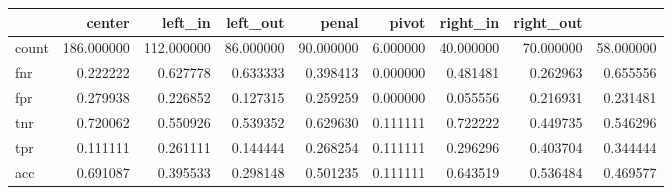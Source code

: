 \begin{tabular}{lrrrrrrrr}
\toprule
{} &      center &    left\_in &   left\_out &     penal &      pivot &   right\_in &  right\_out \\
\midrule
count &  186.000000 &  112.000000 &  86.000000 &  90.000000 &  6.000000 &  40.000000 &  70.000000 &  58.000000 \\
fnr   &    0.222222 &    0.627778 &   0.633333 &   0.398413 &  0.000000 &   0.481481 &   0.262963 &   0.655556 \\
fpr   &    0.279938 &    0.226852 &   0.127315 &   0.259259 &  0.000000 &   0.055556 &   0.216931 &   0.231481 \\
tnr   &    0.720062 &    0.550926 &   0.539352 &   0.629630 &  0.111111 &   0.722222 &   0.449735 &   0.546296 \\
tpr   &    0.111111 &    0.261111 &   0.144444 &   0.268254 &  0.111111 &   0.296296 &   0.403704 &   0.344444 \\
acc   &    0.691087 &    0.395533 &   0.298148 &   0.501235 &  0.111111 &   0.643519 &   0.536484 &   0.469577 \\
\bottomrule
\end{tabular}

